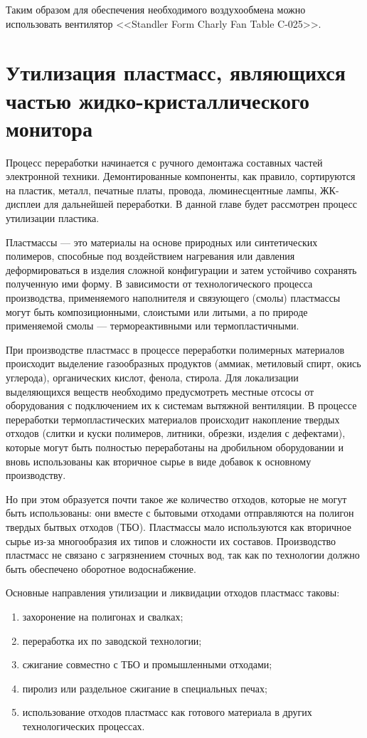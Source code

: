 Таким образом для обеспечения необходимого воздухообмена можно использовать
вентилятор <<Standler Form Charly Fan Table C-025>>.

\section{Утилизация пластмасс, являющихся частью жидко-кристаллического монитора}
Процесс переработки начинается с ручного демонтажа составных частей электронной техники.
Демонтированные компоненты, как правило, сортируются на пластик, металл, печатные платы,
провода, люминесцентные лампы, ЖК-дисплеи для дальнейшей переработки.
В данной главе будет рассмотрен процесс утилизации пластика.

Пластмассы — это материалы на основе природных или синтетических полимеров, способные
под воздействием нагревания или давления деформироваться в изделия сложной конфигурации
и затем устойчиво сохранять полученную ими форму. В зависимости от технологического
процесса производства, применяемого наполнителя и связующего (смолы) пластмассы могут
быть композиционными, слоистыми или литыми, а по природе применяемой
смолы — термореактивными или термопластичными.

При производстве пластмасс в процессе переработки полимерных материалов происходит
выделение газообразных продуктов (аммиак, метиловый спирт, окись углерода), органических
кислот, фенола, стирола. Для локализации выделяющихся веществ необходимо предусмотреть
местные отсосы от оборудования с подключением их к системам вытяжной вентиляции.
В процессе переработки термопластических материалов происходит накопление твердых
отходов (слитки и куски полимеров, литники, обрезки, изделия с дефектами), которые
могут быть полностью переработаны на дробильном оборудовании и вновь использованы
как вторичное сырье в виде добавок к основному производству.

Но при этом образуется почти такое же количество отходов, которые не могут быть
использованы: они вместе с бытовыми отходами отправляются на полигон твердых
бытвых отходов (ТБО). Пластмассы мало используются как вторичное сырье из-за многообразия их типов
и сложности их составов. Производство пластмасс не связано с загрязнением сточных
вод, так как по технологии должно быть обеспечено оборотное водоснабжение.

Основные направления утилизации и ликвидации отходов пластмасс таковы:
\begin{enumerate}
\item захоронение на полигонах и свалках;
\item переработка их по заводской технологии;
\item сжигание совместно с ТБО и промышленными отходами;
\item пиролиз или раздельное сжигание в специальных печах;
\item использование отходов пластмасс как готового материала в других технологических процессах.
\end{enumerate}

